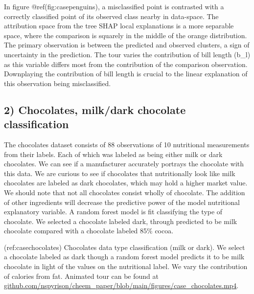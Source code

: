\documentclass[
]{article}
\begin{document}
In figure @ref(fig:casepenguins), a misclassified point is contrasted
with a correctly classified point of its observed class nearby in
data-space. The attribution space from the tree SHAP local explanations
is a more separable space, where the comparison is squarely in the
middle of the orange distribution. The primary observation is between
the predicted and observed clusters, a sign of uncertainty in the
prediction. The tour varies the contribution of bill length (b\_l) as
this variable differs most from the contribution of the comparison
observation. Downplaying the contribution of bill length is crucial to
the linear explanation of this observation being misclassified.

\hypertarget{chocolates-milkdark-chocolate-classification}{%
\subsection{2) Chocolates, milk/dark chocolate
classification}\label{chocolates-milkdark-chocolate-classification}}

The chocolates dataset consists of 88 observations of 10 nutritional
measurements from their labels. Each of which was labeled as being
either milk or dark chocolates. We can see if a manufacturer accurately
portrays the chocolate with this data. We are curious to see if
chocolates that nutritionally look like milk chocolates are labeled as
dark chocolates, which may hold a higher market value. We should note
that not all chocolates consist wholly of chocolate. The addition of
other ingredients will decrease the predictive power of the model
nutritional explanatory variable. A random forest model is fit
classifying the type of chocolate. We selected a chocolate labeled dark,
through predicted to be milk chocolate compared with a chocolate labeled
85\% cocoa.

(ref:casechocolates) Chocolates data type classification (milk or dark).
We select a chocolate labeled as dark though a random forest model
predicts it to be milk chocolate in light of the values on the
nutritional label. We vary the contribution of calories from fat.
Animated tour can be found at
\href{https://github.com/nspyrison/cheem_paper/blob/main/figures/case_chocolates.mp4}{github.com/nspyrison/cheem\_paper/blob/main/figures/case\_chocolates.mp4}.
\end{document}
